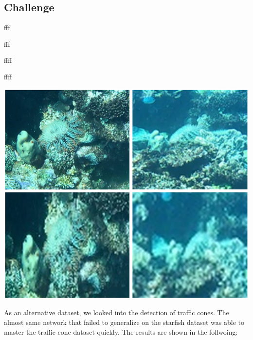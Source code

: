 \documentclass[landscape,a2,final,12pt]{issposter}
\begin{document}
\begin{multicols}{3}
\begin{samepage}
\begin{small}
            \end{small}
    \end{samepage}
    \columnbreak
    \begin{samepage}
    \section{Challenge}
        \begin{minipage}[t]{0.32\textwidth}
            \begin{scriptsize}fff

                fff

                ffff

                ffff

                \begin{center}
                    \includegraphics[scale=0.3]{6_img_quality.png}
                \end{center}

                As an alternative dataset, we looked into the detection of traffic cones. The almost same network that failed to generalize on the starfish dataset was able to master the traffic cone dataset quickly.
                The results are shown in the follwoing:
                
                

            \end{scriptsize}
        \end{minipage}
    \end{samepage}
\end{multicols}
\end{document}
